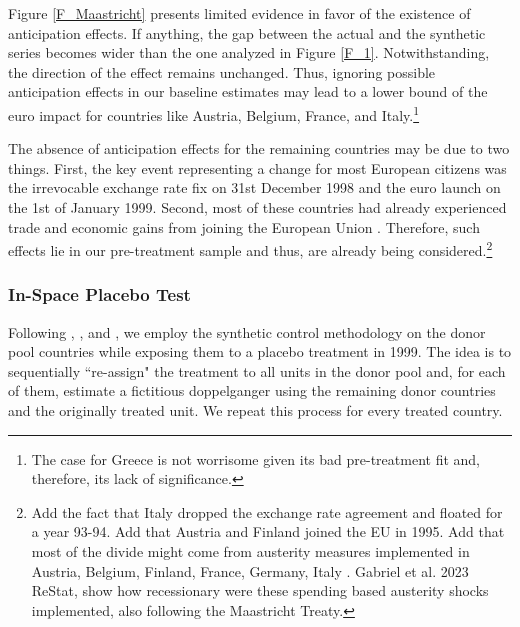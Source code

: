 \documentclass[12pt]{article}
\begin{document}
Figure \ref{F_Maastricht} presents limited evidence in favor of the existence of anticipation effects. If anything, the gap between the actual and the synthetic series becomes wider than the one analyzed in Figure \ref{F_1}. Notwithstanding, the direction of the effect remains unchanged. Thus, ignoring possible anticipation effects in our baseline estimates may lead to a lower bound of the euro impact for countries like Austria, Belgium, France, and Italy.\footnote{The case for Greece is not worrisome given its bad pre-treatment fit and, therefore, its lack of significance.}

The absence of anticipation effects for the remaining countries may be due to two things. First, the key event representing a change for most European citizens was the irrevocable exchange rate fix on 31st December 1998 and the euro launch on the 1st of January 1999. Second, most of these countries had already experienced trade and economic gains from joining the European Union \citep{Campos2018}. Therefore, such effects lie in our pre-treatment sample and thus, are already being considered.\footnote{Add the fact that Italy dropped the exchange rate agreement and floated for a year 93-94. Add that Austria and Finland joined the EU in 1995. Add that most of the divide might come from austerity measures implemented in Austria, Belgium, Finland, France, Germany, Italy \citep{Alesina2019}. Gabriel et al. 2023 ReStat, show how recessionary were these spending based austerity shocks implemented, also following the Maastricht Treaty.}


\subsubsection{In-Space Placebo Test \label{SS_spaceplacebo}}

Following \cite{Abadie2010}, \cite{Abadie2018}, and \cite{Firpo2018}, we employ the synthetic control methodology on the donor pool countries while exposing them to a placebo treatment in 1999. The idea is to sequentially ``re-assign" the treatment to all units in the donor pool and, for each of them, estimate a fictitious doppelganger using the remaining donor countries and the originally treated unit. We repeat this process for every treated country.
\end{document}
